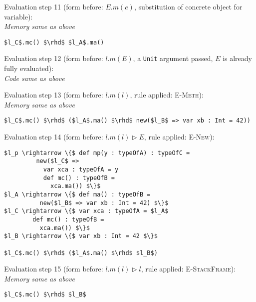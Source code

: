 \documentclass{llncs}
\begin{document}
\vspace{12pt}
\noindent Evaluation step 11 (form before: $E.m(e)$, substitution of concrete object for variable):\\
\vspace{-6pt}
\indent\textit{Memory same as above}\\
\vspace{-6pt}
\begin{lstlisting}[xleftmargin=20pt]
$l_C$.mc() $\rhd$ $l_A$.ma()
\end{lstlisting}

\vspace{12pt}
\noindent Evaluation step 12 (form before: $l.m(E)$, a \lstinline{Unit} argument passed, $E$ is already fully evaluated):\\
\indent\textit{Code same as above}

\vspace{12pt}
\noindent Evaluation step 13 (form before: $l.m(l)$, rule applied: \textsc{E-Meth}):\\
\vspace{-6pt}
\indent\textit{Memory same as above}\\
\vspace{-6pt}
\begin{lstlisting}[xleftmargin=20pt]
$l_C$.mc() $\rhd$ ($l_A$.ma() $\rhd$ new($l_B$ => var xb : Int = 42))
\end{lstlisting}

\vspace{12pt}
\noindent Evaluation step 14 (form before: $l.m(l) \rhd E$, rule applied: \textsc{E-New}):
\vspace{-6pt}
\begin{lstlisting}[xleftmargin=20pt]
$l_p \rightarrow \{$ def mp(y : typeOfA) : typeOfC =
         new($l_C$ =>
           var xca : typeOfA = y
           def mc() : typeOfB =
             xca.ma()) $\}$
$l_A \rightarrow \{$ def ma() : typeOfB =
          new($l_B$ => var xb : Int = 42) $\}$
$l_C \rightarrow \{$ var xca : typeOfA = $l_A$
        def mc() : typeOfB =
          xca.ma()) $\}$
$l_B \rightarrow \{$ var xb : Int = 42 $\}$

$l_C$.mc() $\rhd$ ($l_A$.ma() $\rhd$ $l_B$)
\end{lstlisting}

\vspace{12pt}
\noindent Evaluation step 15 (form before: $l.m(l) \rhd l$, rule applied: \textsc{E-StackFrame}):\\
\vspace{-6pt}
\indent\textit{Memory same as above}\\
\vspace{-6pt}
\begin{lstlisting}[xleftmargin=20pt]
$l_C$.mc() $\rhd$ $l_B$
\end{lstlisting}
\end{document}
